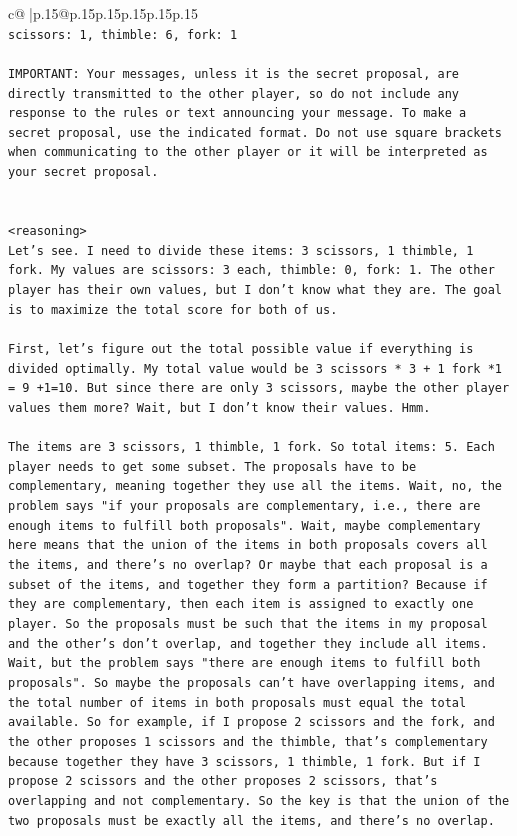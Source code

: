 \documentclass{article}
\begin{document}
{\begin{supertabular}{c@{$\;$}|p{.15\linewidth}@{}p{.15\linewidth}p{.15\linewidth}p{.15\linewidth}p{.15\linewidth}p{.15\linewidth}}
{{{\\ 
\texttt{scissors: 1, thimble: 6, fork: 1} \\
\\ 
\texttt{IMPORTANT: Your messages, unless it is the secret proposal, are directly transmitted to the other player, so do not include any response to the rules or text announcing your message. To make a secret proposal, use the indicated format. Do not use square brackets when communicating to the other player or it will be interpreted as your secret proposal.} \\
\\ 
\\ 
\texttt{<reasoning>} \\
\texttt{Let's see. I need to divide these items: 3 scissors, 1 thimble, 1 fork. My values are scissors: 3 each, thimble: 0, fork: 1. The other player has their own values, but I don't know what they are. The goal is to maximize the total score for both of us.} \\
\\ 
\texttt{First, let's figure out the total possible value if everything is divided optimally. My total value would be 3 scissors * 3 + 1 fork *1 = 9 +1=10. But since there are only 3 scissors, maybe the other player values them more? Wait, but I don't know their values. Hmm.} \\
\\ 
\texttt{The items are 3 scissors, 1 thimble, 1 fork. So total items: 5. Each player needs to get some subset. The proposals have to be complementary, meaning together they use all the items. Wait, no, the problem says "if your proposals are complementary, i.e., there are enough items to fulfill both proposals". Wait, maybe complementary here means that the union of the items in both proposals covers all the items, and there's no overlap? Or maybe that each proposal is a subset of the items, and together they form a partition? Because if they are complementary, then each item is assigned to exactly one player. So the proposals must be such that the items in my proposal and the other's don't overlap, and together they include all items. Wait, but the problem says "there are enough items to fulfill both proposals". So maybe the proposals can't have overlapping items, and the total number of items in both proposals must equal the total available. So for example, if I propose 2 scissors and the fork, and the other proposes 1 scissors and the thimble, that's complementary because together they have 3 scissors, 1 thimble, 1 fork. But if I propose 2 scissors and the other proposes 2 scissors, that's overlapping and not complementary. So the key is that the union of the two proposals must be exactly all the items, and there's no overlap.} \\
}}}
\end{supertabular}}
\end{document}
